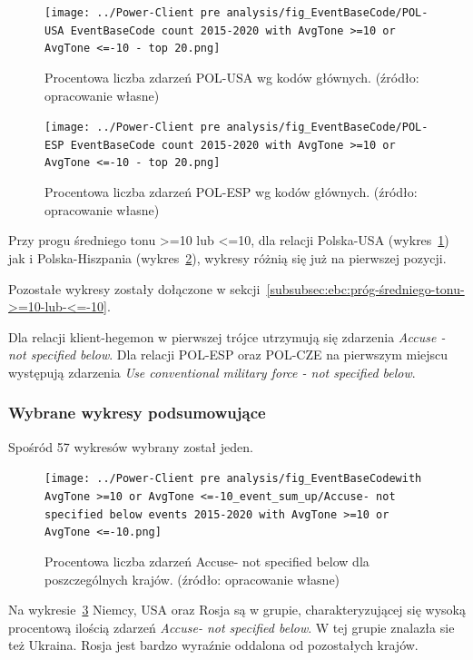\documentclass[11pt]{report}
\begin{document}
    \begin{figure}[!htp]
        \centering
        \texttt{[image: ../Power-Client pre analysis/fig\_EventBaseCode/POL-USA EventBaseCode count 2015-2020 with AvgTone >=10 or AvgTone <=-10 - top 20.png]}
        \caption{Procentowa liczba zdarzeń POL-USA wg kodów głównych. (źródło: opracowanie własne)}
        \label{fig:Power-Client:EBC:AvgToone10:POL-USA}
    \end{figure}

    \begin{figure}[!htp]
        \centering
        \texttt{[image: ../Power-Client pre analysis/fig\_EventBaseCode/POL-ESP EventBaseCode count 2015-2020 with AvgTone >=10 or AvgTone <=-10 - top 20.png]}
        \caption{Procentowa liczba zdarzeń POL-ESP wg kodów głównych. (źródło: opracowanie własne)}
        \label{fig:Power-Client:EBC:AvgToone10:POL-ESP}
    \end{figure}

    Przy progu średniego tonu >=10 lub <=10, dla relacji Polska-USA (wykres~\ref{fig:Power-Client:EBC:AvgToone10:POL-USA}) jak i Polska-Hiszpania (wykres~\ref{fig:Power-Client:EBC:AvgToone10:POL-ESP}),
    wykresy różnią się już na pierwszej pozycji.

    Pozostałe wykresy zostały dołączone w sekcji~\ref{subsubsec:ebc:próg-średniego-tonu->=10-lub-<=-10}.

    Dla relacji klient-hegemon w pierwszej trójce utrzymują się zdarzenia \textit{Accuse - not specified below}.
    Dla relacji POL-ESP oraz POL-CZE na pierwszym miejscu występują zdarzenia \textit{Use conventional military force - not specified below}.

    \subsubsection{Wybrane wykresy podsumowujące}
    Spośród 57 wykresów wybrany został jeden.

    \begin{figure}[!htp]
        \centering
        \texttt{[image: ../Power-Client pre analysis/fig\_EventBaseCodewith AvgTone >=10 or AvgTone <=-10\_event\_sum\_up/Accuse- not specified below events 2015-2020 with AvgTone >=10 or AvgTone <=-10.png]}
        \caption{Procentowa liczba zdarzeń Accuse- not specified below dla poszczególnych krajów. (źródło: opracowanie własne)}
        \label{fig:Power-Client:ERC:Mentions:SumUp:Accuse- not specified below}
    \end{figure}
    Na wykresie~\ref{fig:Power-Client:ERC:Mentions:SumUp:Accuse- not specified below} Niemcy, USA oraz Rosja są w grupie,
    charakteryzującej się wysoką procentową ilością zdarzeń \textit{Accuse- not specified below}.
    W tej grupie znalazła sie też Ukraina.
    Rosja jest bardzo wyraźnie oddalona od pozostałych krajów.
\end{document}
